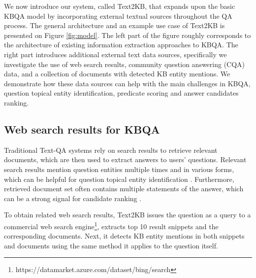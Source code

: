 We now introduce our system, called Text2KB, that expands upon the basic KBQA model by incorporating external textual sources throughout the QA process. The general architecture and an example use case of Text2KB is presented on Figure \ref{fig:model}. 
The left part of the figure roughly corresponds to the architecture of existing information extraction approaches to KBQA.
The right part introduces additional external text data sources, specifically
we investigate the use of web search results, community question answering (CQA) data, and a collection of documents with detected KB entity mentions.
We demonstrate how these data sources can help with the main challenges in KBQA, \ie question topical entity identification, predicate scoring and answer candidates ranking.


\subsection{Web search results for KBQA}
\label{section:method:web}

Traditional Text-QA systems rely on search results to retrieve relevant documents, which are then used to extract answers to users' questions.
Relevant search results mention question entities multiple times and in various forms, which can be helpful for question topical entity identification \cite{SMAPH_ERD:2014}.
Furthermore, retrieved document set often contains multiple statements of the answer, which can be a strong signal for candidate ranking \cite{Lin:2007:EPU:1229179.1229180}.

To obtain related web search results, Text2KB issues the question as a query to a commercial web search engine\footnote{https://datamarket.azure.com/dataset/bing/search}, extracts top 10 result snippets and the corresponding documents.
Next, it detects KB entity mentions in both snippets and documents using the same method it applies to the question itself.

